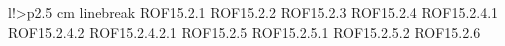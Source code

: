 \begin{tabella}{l!{\VRule}>{\centering\arraybackslash}p{2.5 cm}}
linebreak ROF15.2.1 \linebreak ROF15.2.2 \linebreak ROF15.2.3 \linebreak ROF15.2.4 \linebreak ROF15.2.4.1 \linebreak ROF15.2.4.2 \linebreak ROF15.2.4.2.1 \linebreak ROF15.2.5 \linebreak ROF15.2.5.1 \linebreak ROF15.2.5.2 \linebreak ROF15.2.6 \linebrea
\end{tabella}
